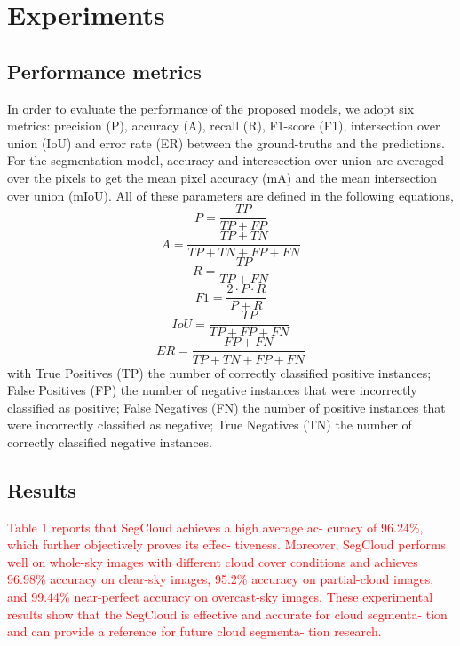 \documentclass[amt, article]{copernicus}
\begin{document}
\section{Experiments}
\label{sec:experiments}

\subsection{Performance metrics}

In order to evaluate the performance of the proposed models, we adopt six metrics: precision (P), accuracy (A), recall (R), F1-score (F1), intersection over union (IoU) and error rate (ER) between the ground-truths and the predictions. For the segmentation model, accuracy and interesection over union are averaged over the pixels to get the mean pixel accuracy (mA) and the mean intersection over union (mIoU). All of these parameters are defined in the following equations,
\begin{equation}
    P = \frac{TP}{TP + FP}
\end{equation}
\begin{equation}
    A = \frac{TP + TN}{TP + TN + FP + FN}
\end{equation}
\begin{equation}
    R = \frac{TP}{TP + FN}
\end{equation}
\begin{equation}
    F1 = \frac{2 \cdot P \cdot R}{P + R}
\end{equation}
\begin{equation}
    IoU = \frac{TP}{TP + FP + FN}
\end{equation}
\begin{equation}
    ER = \frac{FP + FN}{TP + TN + FP + FN}
\end{equation}
with True Positives (TP) the number of correctly classified positive instances; False Positives (FP) the number of negative instances that were incorrectly classified as positive; False Negatives (FN) the number of positive instances that were incorrectly classified as negative; True Negatives (TN) the number of correctly classified negative instances.

\subsection{Results}

\textcolor{red}{Table 1 reports that SegCloud achieves a high average ac-
curacy of 96.24\%, which further objectively proves its effec-
tiveness. Moreover, SegCloud performs well on whole-sky
images with different cloud cover conditions and achieves
96.98\% accuracy on clear-sky images, 95.2\% accuracy on
partial-cloud images, and 99.44\% near-perfect accuracy on overcast-sky images. These experimental results show that
the SegCloud is effective and accurate for cloud segmenta-
tion and can provide a reference for future cloud segmenta-
tion research.}
\end{document}

